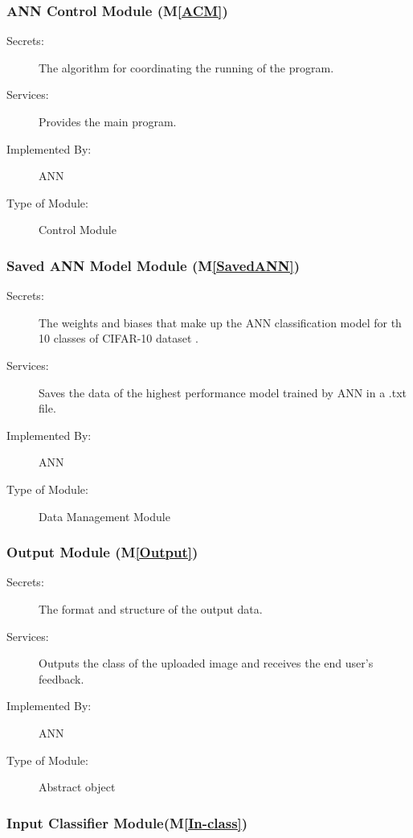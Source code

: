 \documentclass[12pt, titlepage]{article}
\newcommand{\mref}[1]{M\ref{#1}}
\begin{document}
\subsubsection{ANN Control Module (\mref{ACM})}

\begin{description}
\item[Secrets:]The algorithm for coordinating the running of the program.
\item[Services:]Provides the main program.
\item[Implemented By:] ANN
\item[Type of Module:] Control Module
\end{description}

\subsubsection{Saved ANN Model Module (\mref{SavedANN})}

\begin{description}
  \item[Secrets:]The weights and biases that make up the ANN classification model for th 10
  classes of CIFAR-10 dataset \cite{CIFAR10}.
  \item[Services:]Saves the data of the highest performance model trained by ANN in 
  a .txt file.
  \item[Implemented By:] ANN
  \item[Type of Module:] Data Management Module 
  \end{description}

\subsubsection{Output Module (\mref{Output})}

\begin{description}
\item[Secrets:]The format and structure of the output data.
\item[Services:]Outputs the class of the uploaded image and receives 
the end user's feedback.
\item[Implemented By:] ANN
\item[Type of Module:] Abstract object
\end{description}

\subsubsection{Input Classifier Module(\mref{In-class})}
\end{document}
